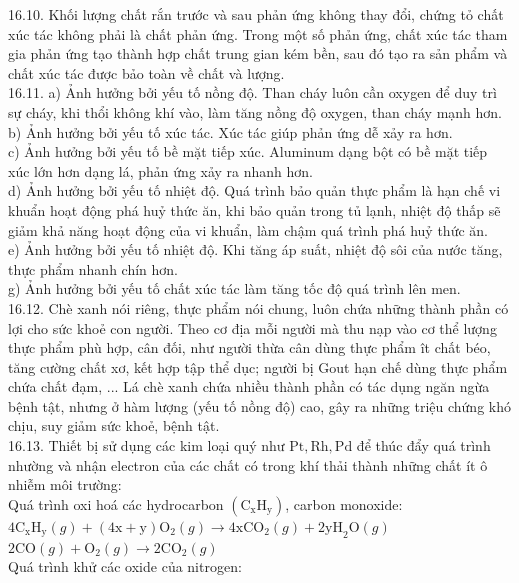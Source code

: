 \documentclass[10pt]{article}
\begin{document}
16.10. Khối lượng chất rắn trước và sau phản ứng không thay đổi, chứng tỏ chất xúc tác không phải là chất phản ứng. Trong một số phản ứng, chất xúc tác tham gia phản ứng tạo thành hợp chất trung gian kém bền, sau đó tạo ra sản phẩm và chất xúc tác được bảo toàn về chất và lượng.\\
16.11. a) Ảnh hưởng bởi yếu tố nồng độ. Than cháy luôn cần oxygen để duy trì sự cháy, khi thổi không khí vào, làm tăng nồng độ oxygen, than cháy mạnh hơn.\\
b) Ảnh hưởng bởi yếu tố xúc tác. Xúc tác giúp phản ứng dễ xảy ra hơn.\\
c) Ảnh hưởng bởi yếu tố bề mặt tiếp xúc. Aluminum dạng bột có bề mặt tiếp xúc lớn hơn dạng lá, phản ứng xảy ra nhanh hơn.\\
d) Ảnh hưởng bởi yếu tố nhiệt độ. Quá trình bảo quản thực phẩm là hạn chế vi khuẩn hoạt động phá huỷ thức ăn, khi bảo quản trong tủ lạnh, nhiệt độ thấp sẽ giảm khả năng hoạt động của vi khuẩn, làm chậm quá trình phá huỷ thức ăn.\\
e) Ảnh hưởng bởi yếu tố nhiệt độ. Khi tăng áp suất, nhiệt độ sôi của nước tăng, thực phẩm nhanh chín hơn.\\
g) Ảnh hưởng bởi yếu tố chất xúc tác làm tăng tốc độ quá trình lên men.\\
16.12. Chè xanh nói riêng, thực phẩm nói chung, luôn chứa những thành phần có lợi cho sức khoẻ con người. Theo cơ địa mỗi người mà thu nạp vào cơ thể lượng thực phẩm phù hợp, cân đối, như người thừa cân dùng thực phẩm ît chất béo, tăng cường chất xơ, kết hợp tập thể dục; người bị Gout hạn chế dùng thực phẩm chứa chất đạm, ... Lá chè xanh chứa nhiều thành phần có tác dụng ngăn ngừa bệnh tật, nhưng ở hàm lượng (yếu tố nồng độ) cao, gây ra những triệu chứng khó chịu, suy giảm sức khoẻ, bệnh tật.\\
16.13. Thiết bị sử dụng các kim loại quý như $\mathrm{Pt}, \mathrm{Rh}, \mathrm{Pd}$ để thúc đẩy quá trình nhường và nhận electron của các chất có trong khí thải thành những chất ít ô nhiễm môi trường:\\
Quá trình oxi hoá các hydrocarbon $\left(\mathrm{C}_{\mathrm{x}} \mathrm{H}_{\mathrm{y}}\right)$, carbon monoxide:\\
$4 \mathrm{C}_{\mathrm{x}} \mathrm{H}_{\mathrm{y}}(g)+(4 \mathrm{x}+\mathrm{y}) \mathrm{O}_{2}(g) \rightarrow 4 \mathrm{xCO}_{2}(g)+2 \mathrm{yH}_{2} \mathrm{O}(g)$\\
$2 \mathrm{CO}(g)+\mathrm{O}_{2}(g) \rightarrow 2 \mathrm{CO}_{2}(g)$\\
Quá trình khử các oxide của nitrogen:\\
\end{document}
